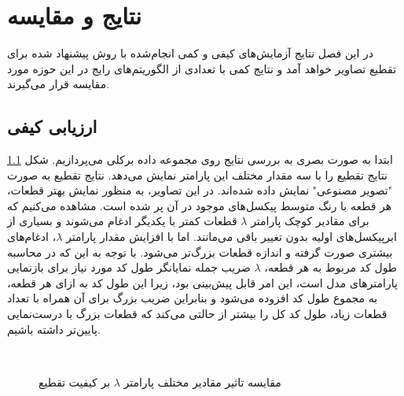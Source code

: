 \chapter{نتایج و مقایسه} \label{ch:results}
در این فصل نتایج آزمایش‌های کیفی و کمی انجام‌شده با روش پیشنهاد شده برای تقطیع تصاویر خواهد آمد و نتایج کمی با تعدادی از الگوریتم‌های رایج در این حوزه مورد مقایسه قرار می‌گیرند.

\section{ارزیابی کیفی}
ابتدا به صورت بصری به بررسی نتایج روی مجموعه داده برکلی می‌پردازیم.
شکل
\ref{fig.testlambda}
نتایج تقطیع را با سه مقدار مختلف این پارامتر نمایش می‌دهد.
نتایج تقطیع به صورت "تصویر مصنوعی" نمایش داده شده‌اند.
در این تصاویر، به منظور نمایش بهتر قطعات، هر قطعه با رنگ متوسط پیکسل‌های موجود در آن پر شده است.
مشاهده می‌کنیم که برای مقادیر کوچک پارامتر
$\lambda$
قطعات کمتر با یکدیگر ادغام می‌شوند و بسیاری از ابرپیکسل‌های اولیه بدون تغییر باقی می‌مانند.
اما با افزایش مقدار پارامتر
$\lambda$،
ادغام‌های بیشتری صورت گرفته و اندازه قطعات بزرگ‌تر می‌شود.
با توجه به این که در محاسبه طول کد مربوط به هر قطعه،
$\lambda$
ضریب جمله نمایانگر طول کد مورد نیاز برای بازنمایی پارامترهای مدل است، این امر قابل پیش‌بینی بود،
زیرا این طول کد به ازای هر قطعه، به مجموع طول کد افزوده می‌شود و 
بنابراین ضریب بزرگ برای آن همراه با تعداد قطعات زیاد، طول کد کل را بیشتر از حالتی می‌کند که قطعات بزرگ با درست‌نمایی پایین‌تر داشته باشیم.




\begin{figure}[tp]
	\\[20pt]
	\caption{
مقایسه تاثیر مقادیر مختلف پارامتر
$\lambda$
بر کیفیت تقطیع
		\label{fig.testlambda}
	}
\end{figure}





